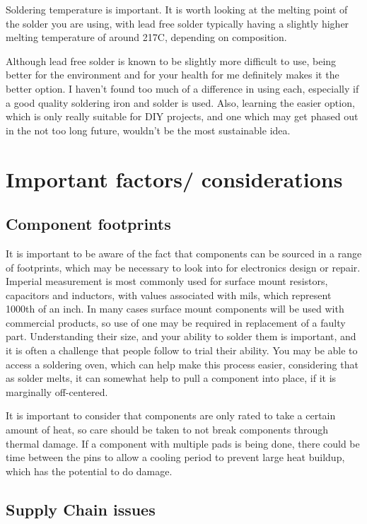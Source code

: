 \documentclass[a4paper,11pt]{report}
\begin{document}
Soldering temperature is important. It is worth looking at the melting point of the solder you are using, with lead free solder typically having a slightly higher melting temperature of around 217C, depending on composition.

Although lead free solder is known to be slightly more difficult to use, being better for the environment and for your health for me definitely makes it the better option. I haven't found too much of a difference in using each, especially if a good quality soldering iron and solder is used. Also, learning the easier option, which is only really suitable for DIY projects, and one which may get phased out in the not too long future, wouldn't be the most sustainable idea.

\section{Important factors/ considerations}

\subsection{Component footprints}

It is important to be aware of the fact that components can be sourced in a range of footprints, which may be necessary to look into for electronics design or repair. Imperial measurement is most commonly used for surface mount resistors, capacitors and inductors, with values associated with mils, which represent 1000th of an inch. In many cases surface mount components will be used with commercial products, so use of one may be required in replacement of a faulty part. Understanding their size, and your ability to solder them is important, and it is often a challenge that people follow to trial their ability. You may be able to access a soldering oven, which can help make this process easier, considering that as solder melts, it can somewhat help to pull a component into place, if it is marginally off-centered.

It is important to consider that components are only rated to take a certain amount of heat, so care should be taken to not break components through thermal damage. If a component with multiple pads is being done, there could be time between the pins to allow a cooling period to prevent large heat buildup, which has the potential to do damage.

\subsection{Supply Chain issues}
\end{document}
